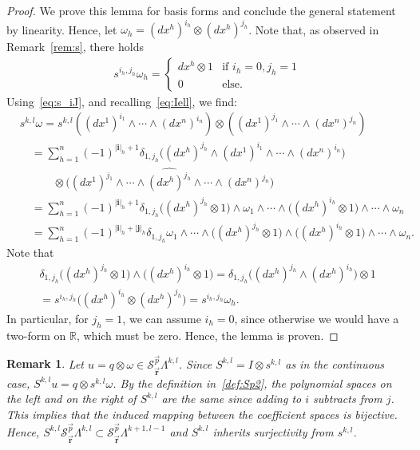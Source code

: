 \documentclass[final]{amsart}%
\newtheorem{remark}{Remark}
\newcommand{\0}{\mathaccent23}
\newcommand\R{\mathbb{R}}
\newcommand{\vbr}{\vec{\mathbf r}}
\newcommand{\vp}{\vec{p}}
\begin{document}
\begin{proof}
We prove this lemma for basis forms and conclude the general statement by linearity. Hence, let $\omega_h = (dx^h)^{i_h} \otimes (dx^h)^{j_h}$. Note that, as observed in Remark~\ref{rem:s}, there holds
\begin{gather}
    s^{i_h,j_h}\omega_h=
    \begin{cases}
    dx^h\otimes 1 &\text{if } i_h=0, j_h=1\\
    0&\text{else.}
    \end{cases}
\end{gather}
Using~\eqref{eq:s_iJ}, and recalling~\eqref{eq:Iell}, we find:
\begin{align*}
    &s^{k, l}\omega
    =s^{k, l}( (dx^1)^{i_1} \wedge \cdots \wedge (dx^n)^{i_n} ) \otimes
    ( (dx^1)^{j_1} \wedge \cdots \wedge (dx^n)^{j_n} )\\
    &\quad= \sum_{h=1}^n (-1)^{|\bm{i}|_{h}+1} \delta_{1,j_h}
    \bigl( (dx^h)^{j_h} \wedge (dx^1)^{i_1} \wedge \cdots \wedge (dx^n)^{i_n}\bigr)
    \\ 
    &\quad\qquad\otimes \bigl( (dx^1)^{j_1} \wedge \cdots \wedge \widehat{(dx^h)^{j_h}} \wedge \cdots \wedge (dx^n)^{j_n} \bigr)
    \\
    &\quad = \sum_{h=1}^n (-1)^{|\bm{i}|_{h}+1} \delta_{1,j_h}
    \bigl( (dx^h)^{j_h} \otimes 1\bigr) \wedge \omega_1
    \wedge \cdots
    \wedge \bigl( (dx^h)^{i_h} \otimes 1 \bigr) \wedge \cdots \wedge 
    \omega_n \\
    &\quad = \sum_{h=1}^n (-1)^{|\bm{i}|_{h}+|\bm{j}|_{h}} \delta_{1,j_h}
    \omega_1 \wedge \cdots\wedge
    \bigl( (dx^h)^{j_h} \otimes 1\bigr)
    \wedge \bigl( (dx^h)^{i_h} \otimes 1 \bigr)
    \wedge \cdots \wedge \omega_n.
\end{align*}
Note that 
\begin{multline*}
\delta_{1,j_h}\bigl( (dx^h)^{j_h} \otimes 1 \bigr)
\wedge \bigl( (dx^h)^{i_h} \otimes 1 \bigr)
= \delta_{1,j_h}\bigl((dx^h)^{j_h} \wedge (dx^h)^{i_h}\bigr) \otimes 1
\\= s^{i_h,j_h} \bigl((dx^h)^{i_h} \otimes (dx^h)^{j_h}\bigr)
=  s^{i_h,j_h}\omega_h.
\end{multline*}
In particular, for $j_h=1$, we can assume $i_h=0$, since otherwise we would have a two-form on $\R$, which must be zero. Hence, the lemma is proven.
\end{proof}

\begin{remark}
  Let $u = q \otimes \omega \in \mathscr{S}_{\vbr}^{\vp}\Lambda^{k, l}$. Since $S^{k, l}=I\otimes s^{k, l}$ as in the continuous case, $S^{k,l} u = q \otimes s^{k,l}\omega$. By the definition in~\eqref{def:Sp2}, the polynomial spaces on the left and on the right of $S^{k,l}$ are the same since adding to $i$ subtracts from $j$. This implies that the induced mapping between the coefficient spaces is bijective. Hence, $S^{k, l}\mathscr{S}_{\vbr}^{\vp}\Lambda^{k, l}\subset \mathscr{S}_{\vbr}^{\vp}\Lambda^{k+1, l-1}$ and $S^{k,l}$ inherits surjectivity from $s^{k,l}$.
\end{remark}
 
\end{document}
